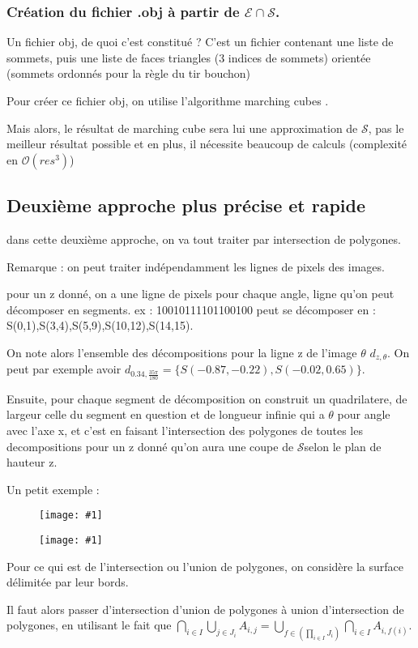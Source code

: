 \documentclass{article}
\newcommand*{\unefiguregraphicsimple}[1]{\begin{figure}[!h] \centering \texttt{[image: \#1]}\end{figure}}
\begin{document}
\subsubsection*{Création du fichier .obj à partir de $\mathcal{E}\cap\mathcal{S}$.}

Un fichier obj, de quoi c'est constitué ? C'est un fichier contenant
une liste de sommets, puis une liste de faces triangles (3 indices
de sommets) orientée (sommets ordonnés pour la règle du tir bouchon)

Pour créer ce fichier obj, on utilise l'algorithme marching cubes
.\cite{key-1}

Mais alors, le résultat de marching cube sera lui une approximation de $\mathcal{S}$,
pas le meilleur résultat possible et en plus, il nécessite beaucoup
de calculs (complexité en $\mathcal{O}(res^{3})$)

\subsection*{Deuxième approche plus précise et rapide}

dans cette deuxième approche, on va tout traiter par intersection
de polygones.

Remarque : on peut traiter indépendamment les lignes de pixels des
images.

pour un z donné, on a une ligne de pixels pour chaque angle, ligne
qu'on peut décomposer en segments. ex : 10010111101100100 peut se
décomposer en : S(0,1),S(3,4),S(5,9),S(10,12),S(14,15).

On note alors l'ensemble des décompositions pour la ligne z de l'image
$\theta$ $d_{z,\theta}$. On peut par exemple avoir $d_{0.34,\frac{35\pi}{180}}=\{S(-0.87,-0.22),S(-0.02,0.65)\}$.

Ensuite, pour chaque segment de décomposition on construit un quadrilatere,
de largeur celle du segment en question et de longueur infinie qui
a $\theta$ pour angle avec l'axe x, et c'est en faisant l'intersection
des polygones de toutes les decompositions pour un z donné qu'on aura
une coupe de $\mathcal{S}$selon le plan de hauteur z.

Un petit exemple : \unefiguregraphicsimple{14}\unefiguregraphicsimple{13}

Pour ce qui est de l'intersection ou l'union de polygones, on considère
la surface délimitée par leur bords.

Il faut alors passer d'intersection d'union de polygones à union d'intersection
de polygones, en utilisant le fait que $\bigcap_{i\in I}\bigcup_{j\in J_{i}}A_{i,j}=\bigcup_{f\in(\prod_{i\in I}J_{i})}\bigcap_{i\in I}A_{i,f(i)}$.
\end{document}
